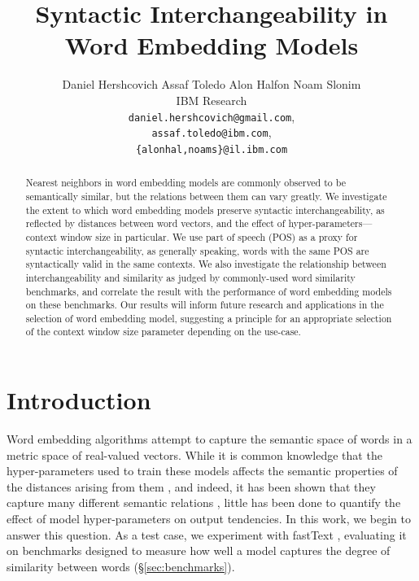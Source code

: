 \documentclass[11pt,a4paper]{article}
\title{Syntactic Interchangeability in Word Embedding Models}
\author{
Daniel Hershcovich \qquad Assaf Toledo \qquad Alon Halfon \qquad Noam Slonim \\
IBM Research\\
\texttt{daniel.hershcovich@gmail.com},\\
\texttt{assaf.toledo@ibm.com},\\
\texttt{\{alonhal,noams\}@il.ibm.com}
}
\begin{document}
    \maketitle

    \begin{abstract}
    Nearest neighbors in word embedding models are commonly observed to be
    semantically similar, but the relations between them can vary greatly.
    We investigate the extent to which word embedding models
    preserve syntactic interchangeability, as reflected by distances between
    word vectors, and the effect of hyper-parameters---context window size in particular.
    We use part of speech (POS) as a proxy for syntactic interchangeability,
    as generally speaking, words with the same POS are syntactically valid in the same contexts.
    We also investigate the relationship between interchangeability
    and similarity as judged by commonly-used word similarity benchmarks,
    and correlate the result with the performance of word embedding models
    on these benchmarks.
    Our results will inform future research and applications in the selection
    of word embedding model, suggesting a principle for an appropriate selection
    of the context window size parameter depending on the use-case.
    \end{abstract}

    \section{Introduction}\label{sec:introduction}

    Word embedding algorithms \cite{mikolov2013efficient,pennington2014glove,levy2015improving}
    attempt to capture the semantic space of words
    in a metric space of real-valued vectors.
    While it is common knowledge that the hyper-parameters used to train these
    models affects the semantic properties of the distances arising from them
    \cite{bansal2014tailoring,lin2015unsupervised,goldberg2016primer},
    and indeed, it has been shown that
    they capture many different semantic relations \cite{yang2006verb,agirre2009study},
    little has been done to quantify the
    effect of model hyper-parameters on output tendencies.
    In this work, we begin to answer this question.
    As a test case, we experiment with fastText \cite{bojanowski2016enriching},
    evaluating it on benchmarks designed to measure how well a model captures the degree
    of similarity between words (\S\ref{sec:benchmarks}).
    
\end{document}
